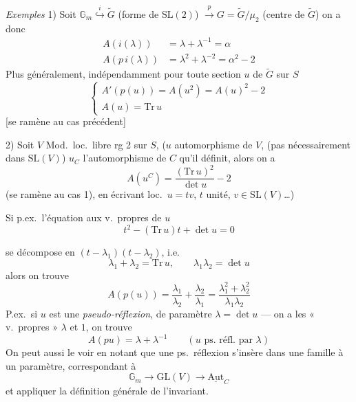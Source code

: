 \documentclass[11pt,a4paper]{article}
\begin{document}
\emph{Exemples} 1) Soit
$\mathbb{G}_m \overset{i}{\hookrightarrow} \widetilde{G}$ (forme de
$\mathrm{SL}(2)$) $\xrightarrow{\ p\ } G = \widetilde{G}/\mu_2$ (centre de
$\widetilde{G}$) on a donc
\begin{align*}
  A(i(\lambda)) &= \lambda + \lambda^{-1} = \alpha \\
  A(p\,i(\lambda)) &= \lambda^2 + \lambda^{-2} = \alpha^2 - 2
\end{align*}
Plus généralement, indépendamment \ill{} \ill{} \ill{}
pour toute section $u$ de $\widetilde{G}$ sur $S$
\[
  \begin{cases}
    A'(p(u)) = A(u^2) = A(u)^2 - 2 \\
    A(u) = \mathrm{Tr}\, u
  \end{cases}
\]
[se ramène au cas précédent]

2) Soit $V$ Mod.\ loc.\ libre rg 2 sur $S$, ($u$ automorphisme de $V$,
 (pas nécessairement dans $\mathrm{SL}(V)$) $u_C$
l'automorphisme de $C$  qu'il définit,
alors on a
\[
  A(u^C) = \frac{(\mathrm{Tr}\, u)^2}{\det u} - 2
\]
(se ramène au cas 1), en écrivant loc.\ $u = tv$, $t$ unité,
$v \in \mathrm{SL}(V)$\ldots)

Si p.ex.\ l'équation aux v.\ propres de $u$
\[
  t^2 - (\mathrm{Tr}\, u)t + \det u = 0
\]

se décompose en $(t - \lambda_1)(t - \lambda_2)$, i.e.
\[
  \lambda_1 + \lambda_2 = \mathrm{Tr}\, u, \qquad \lambda_1\lambda_2 = \det u
\]
alors on trouve
\[
  A(p(u)) = \frac{\lambda_1}{\lambda_2} + \frac{\lambda_2}{\lambda_1} = \frac{\lambda_1^2 + \lambda_2^2}{\lambda_1\lambda_2}
\]
P.ex.\ si $u$ est une \emph{pseudo-réflexion}, \struck{\ill{}} de paramètre
$\lambda = \det u$ --- on a les « v.\ propres » $\lambda$ et $1$, on trouve
\[
  A(pu) = \lambda + \lambda^{-1} \qquad (u \text{ ps.\ réfl.\ par } \lambda)
\]
On peut aussi le voir en notant que une ps.\ réflexion s'insère dans une
famille à un paramètre, correspondant à
\[
  \mathbb{G}_m \longrightarrow \mathrm{GL}(V) \longrightarrow \underline{\mathrm{Aut}}_C
\]
et appliquer la définition générale de l'invariant.
\end{document}
